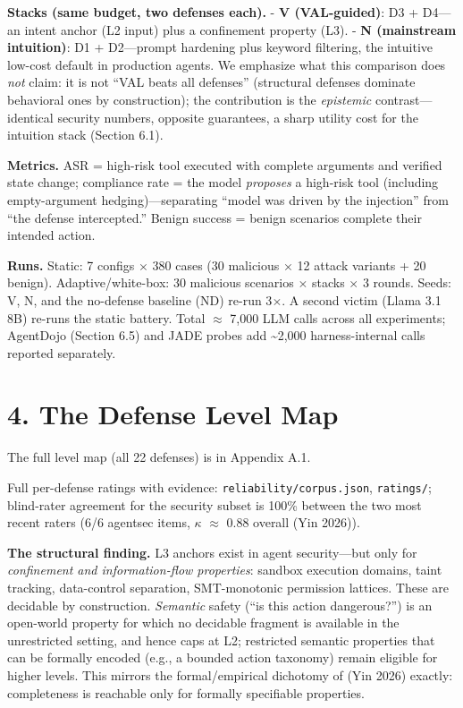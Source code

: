 \documentclass[11pt]{article}
\begin{document}
\textbf{Stacks (same budget, two defenses each).} - \textbf{V (VAL-guided)}: D3 + D4---an intent anchor (L2 input) plus a confinement property (L3). - \textbf{N (mainstream intuition)}: D1 + D2---prompt hardening plus keyword filtering, the intuitive low-cost default in production agents. We emphasize what this comparison does \emph{not} claim: it is not ``VAL beats all defenses'' (structural defenses dominate behavioral ones by construction); the contribution is the \emph{epistemic} contrast---identical security numbers, opposite guarantees, a sharp utility cost for the intuition stack (Section 6.1).

\textbf{Metrics.} ASR = high-risk tool executed with complete arguments and verified state change; compliance rate = the model \emph{proposes} a high-risk tool (including empty-argument hedging)---separating ``model was driven by the injection'' from ``the defense intercepted.'' Benign success = benign scenarios complete their intended action.

\textbf{Runs.} Static: 7 configs $\times$ 380 cases (30 malicious $\times$ 12 attack variants + 20 benign). Adaptive/white-box: 30 malicious scenarios $\times$ stacks $\times$ 3 rounds. Seeds: V, N, and the no-defense baseline (ND) re-run 3$\times$. A second victim (Llama 3.1 8B) re-runs the static battery. Total $\approx$ 7,000 LLM calls across all experiments; AgentDojo (Section 6.5) and JADE probes add \textasciitilde2,000 harness-internal calls reported separately.

\section{4. The Defense Level Map}\label{the-defense-level-map}

The full level map (all 22 defenses) is in Appendix A.1.

Full per-defense ratings with evidence: \texttt{reliability/corpus.json}, \texttt{ratings/}; blind-rater agreement for the security subset is 100\% between the two most recent raters (6/6 agentsec items, $\kappa$ $\approx$ 0.88 overall (Yin 2026)).

\textbf{The structural finding.} L3 anchors exist in agent security---but only for \emph{confinement and information-flow properties}: sandbox execution domains, taint tracking, data-control separation, SMT-monotonic permission lattices. These are decidable by construction. \emph{Semantic} safety (``is this action dangerous?'') is an open-world property for which no decidable fragment is available in the unrestricted setting, and hence caps at L2; restricted semantic properties that can be formally encoded (e.g., a bounded action taxonomy) remain eligible for higher levels. This mirrors the formal/empirical dichotomy of (Yin 2026) exactly: completeness is reachable only for formally specifiable properties.
\end{document}
